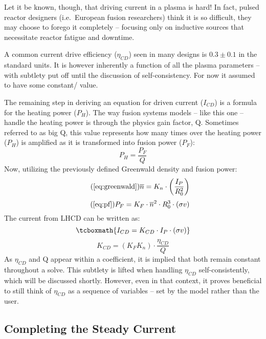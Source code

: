 Let it be known, though, that driving current in a plasma is hard! In fact, pulsed reactor designers (i.e.\ European fusion researchers) think it is so difficult, they may choose to forego it completely -- focusing only on inductive sources that necessitate reactor fatigue and downtime. 

A common current drive efficiency ($\eta_{CD}$) seen in many designs is $0.3 \pm 0.1 $ in the standard units. It is however inherently a function of all the plasma parameters -- with subtlety put off until the discussion of self-consistency. For now it assumed to have some constant/ value.

The remaining step in deriving an equation for driven current ($I_{CD}$) is a formula for the heating power ($P_H$). The way fusion systems models -- like this one -- handle the heating power is through the physics gain factor, Q. Sometimes referred to as big Q, this value represents how many times over the heating power ($P_H$) is amplified as it is transformed into fusion power ($P_F$):
\begin{equation}
	P_H = \frac{P_F}{Q}
\end{equation}
Now, utilizing the previously defined Greenwald density and fusion power:
 \begin{equation}
 	\tag{\ref{eq:greenwald}}
 	\overline n = K_n \cdot \left( \frac{I_P}{R_0^2} \right)
 \end{equation}
 \begin{equation}
	\tag{\ref{eq:pf}}
	P_F = K_F \cdot \overline{n}^2 \cdot R_0^3  \cdot (\sigma v)
\end{equation}
The current from LHCD can be written as:
\begin{equation}
	\label{eq:icd}
	\tcboxmath{
	I_{CD} = K_{CD} \cdot I_P \cdot ( \sigma v )
	}
\end{equation}
\begin{equation}
	K_{CD} = \left( K_F K_n \right) \cdot \frac{\eta_{CD}}{Q}
\end{equation}
As $\eta_{CD}$ and Q appear within a  coefficient, it is implied that both remain constant throughout a solve. This subtlety is lifted when handling $\eta_{CD}$ self-consistently, which will be discussed shortly. However, even in that context, it proves beneficial to still think of $\eta_{CD}$ as a sequence of  variables -- set by the model rather than the user.

\subsection{Completing the Steady Current}

